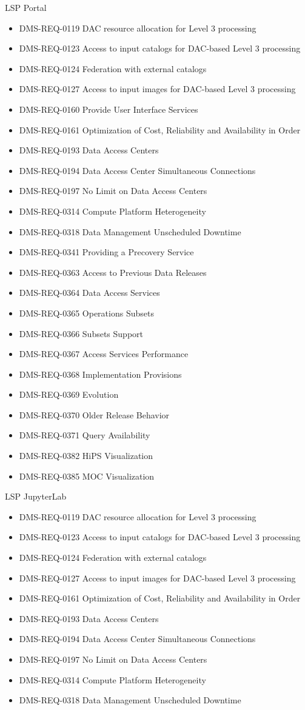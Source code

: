 LSP Portal \begin{itemize}
\item DMS-REQ-0119 DAC resource allocation for Level 3 processing
\item DMS-REQ-0123 Access to input catalogs for DAC-based Level 3 processing
\item DMS-REQ-0124 Federation with external catalogs
\item DMS-REQ-0127 Access to input images for DAC-based Level 3 processing
\item DMS-REQ-0160 Provide User Interface Services
\item DMS-REQ-0161 Optimization of Cost, Reliability and Availability in Order
\item DMS-REQ-0193 Data Access Centers
\item DMS-REQ-0194 Data Access Center Simultaneous Connections
\item DMS-REQ-0197 No Limit on Data Access Centers
\item DMS-REQ-0314 Compute Platform Heterogeneity
\item DMS-REQ-0318 Data Management Unscheduled Downtime
\item DMS-REQ-0341 Providing a Precovery Service
\item DMS-REQ-0363 Access to Previous Data Releases
\item DMS-REQ-0364 Data Access Services
\item DMS-REQ-0365 Operations Subsets
\item DMS-REQ-0366 Subsets Support
\item DMS-REQ-0367 Access Services Performance
\item DMS-REQ-0368 Implementation Provisions
\item DMS-REQ-0369 Evolution
\item DMS-REQ-0370 Older Release Behavior
\item DMS-REQ-0371 Query Availability
\item DMS-REQ-0382 HiPS Visualization
\item DMS-REQ-0385 MOC Visualization
\end{itemize}
LSP JupyterLab \begin{itemize}
\item DMS-REQ-0119 DAC resource allocation for Level 3 processing
\item DMS-REQ-0123 Access to input catalogs for DAC-based Level 3 processing
\item DMS-REQ-0124 Federation with external catalogs
\item DMS-REQ-0127 Access to input images for DAC-based Level 3 processing
\item DMS-REQ-0161 Optimization of Cost, Reliability and Availability in Order
\item DMS-REQ-0193 Data Access Centers
\item DMS-REQ-0194 Data Access Center Simultaneous Connections
\item DMS-REQ-0197 No Limit on Data Access Centers
\item DMS-REQ-0314 Compute Platform Heterogeneity
\item DMS-REQ-0318 Data Management Unscheduled Downtime
\end{itemize}
